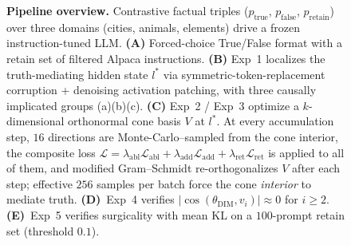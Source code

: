 \begin{figure}[t]



\caption{
\textbf{Pipeline overview.} Contrastive factual triples ($p_{\text{true}}$,
$p_{\text{false}}$, $p_{\text{retain}}$) over three domains (cities, animals,
elements) drive a frozen instruction-tuned LLM.
\textbf{(A)} Forced-choice True/False format with a retain set of filtered
Alpaca instructions.
\textbf{(B)} Exp~1 localizes the truth-mediating hidden state $l^{*}$ via
symmetric-token-replacement corruption + denoising activation patching, with
three causally implicated groups (a)(b)(c).
\textbf{(C)} Exp~2 / Exp~3 optimize a $k$-dimensional orthonormal cone basis
$V$ at $l^{*}$. At every accumulation step, $16$ directions are
Monte-Carlo--sampled from the cone interior, the composite loss
$\mathcal{L} = \lambda_{\text{abl}}\mathcal{L}_{\text{abl}} +
\lambda_{\text{add}}\mathcal{L}_{\text{add}} +
\lambda_{\text{ret}}\mathcal{L}_{\text{ret}}$ is applied to all of them, and
modified Gram--Schmidt re-orthogonalizes $V$ after each step; effective
$256$ samples per batch force the cone \emph{interior} to mediate truth.
\textbf{(D)}~Exp~4 verifies $|\cos(\theta_{\text{DIM}}, v_i)| \approx 0$ for
$i \ge 2$.
\textbf{(E)}~Exp~5 verifies surgicality with mean KL on a $100$-prompt
retain set (threshold $0.1$).
}
\label{fig:pipeline}
\end{figure}
